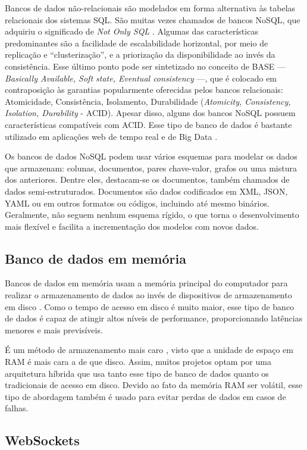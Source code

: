 Bancos de dados não-relacionais são modelados em forma alternativa às tabelas relacionais dos sistemas SQL. São muitas vezes chamados de bancos NoSQL, que adquiriu o significado de \emph{Not Only SQL} \cite{nosql}. Algumas das características predominantes são a facilidade de escalabilidade horizontal, por meio de replicação e ``clusterização'', e a priorização da disponibilidade ao invés da consistência. Esse último ponto pode ser sintetizado no conceito de BASE --- \emph{Basically Available, Soft state, Eventual consistency} ---, que é colocado em contraposição às garantias popularmente oferecidas pelos bancos relacionais: Atomicidade, Consistência, Isolamento, Durabilidade (\emph{Atomicity, Consistency, Isolation, Durability} - ACID). Apesar disso, alguns dos bancos NoSQL possuem características compatíveis com ACID. Esse tipo de banco de dados é bastante utilizado em aplicações web de tempo real e de Big Data \cite{pereira}.

Os bancos de dados NoSQL podem usar vários esquemas para modelar os dados que armazenam: colunas, documentos, pares chave-valor, grafos ou uma mistura dos anteriores. Dentre eles, destacam-se os documentos, também chamados de dados semi-estruturados. Documentos são dados codificados em XML, JSON, YAML ou em outros formatos ou códigos, incluindo até mesmo binários. Geralmente, não seguem nenhum esquema rígido, o que torna o desenvolvimento mais flexível e facilita a incrementação dos modelos com novos dados.

\subsection{Banco de dados em memória}

Bancos de dados em memória usam a memória principal do computador para realizar o armazenamento de dados ao invés de dispositivos de armazenamento em disco \cite{raima}. Como o tempo de acesso em disco é muito maior, esse tipo de banco de dados é capaz de atingir altos níveis de performance, proporcionando latências menores e mais previsíveis.

É um método de armazenamento mais caro \cite{mullins}, visto que a unidade de espaço em RAM é mais cara a de que disco. Assim, muitos projetos optam por uma arquitetura híbrida que usa tanto esse tipo de banco de dados quanto os tradicionais de acesso em disco. Devido ao fato da memória RAM ser volátil, esse tipo de abordagem também é usado para evitar perdas de dados em casos de falhas.

\subsection{WebSockets \label{sub:websocket}}

